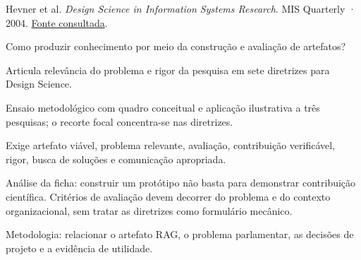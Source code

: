 {\small Hevner et al. \textit{Design Science in Information Systems Research}. MIS Quarterly · 2004. \href{https://ailab-ua.github.io/courses/MIS611D/hevner-2004-design_science_in_is_research.pdf}{Fonte consultada}.\par}

Como produzir conhecimento por meio da construção e avaliação de artefatos?

Articula relevância do problema e rigor da pesquisa em sete diretrizes para Design Science.

Ensaio metodológico com quadro conceitual e aplicação ilustrativa a três pesquisas; o recorte focal concentra-se nas diretrizes.

Exige artefato viável, problema relevante, avaliação, contribuição verificável, rigor, busca de soluções e comunicação apropriada.

\begin{itemize}
\end{itemize}

Análise da ficha: construir um protótipo não basta para demonstrar contribuição científica. Critérios de avaliação devem decorrer do problema e do contexto organizacional, sem tratar as diretrizes como formulário mecânico.

Metodologia: relacionar o artefato RAG, o problema parlamentar, as decisões de projeto e a evidência de utilidade.

